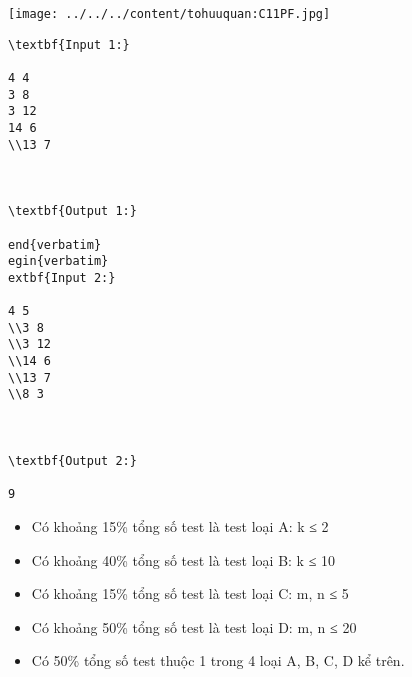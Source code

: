 \texttt{[image: ../../../content/tohuuquan:C11PF.jpg]}
\begin{verbatim}
\textbf{Input 1:}

4 4
3 8
3 12
14 6
\\13 7



\textbf{Output 1:}

end{verbatim}
egin{verbatim}
extbf{Input 2:}

4 5
\\3 8
\\3 12
\\14 6
\\13 7
\\8 3



\textbf{Output 2:}

9\end{verbatim}
\begin{itemize}
	\item Có khoảng 15\% tổng số test là test loại A: k ≤ 2
	\item Có khoảng 40\% tổng số test là test loại B: k ≤ 10
	\item Có khoảng 15\% tổng số test là test loại C: m, n ≤ 5
	\item Có khoảng 50\% tổng số test là test loại D: m, n ≤ 20
	\item Có 50\% tổng số test thuộc 1 trong 4 loại A, B, C, D kể trên.
\end{itemize}